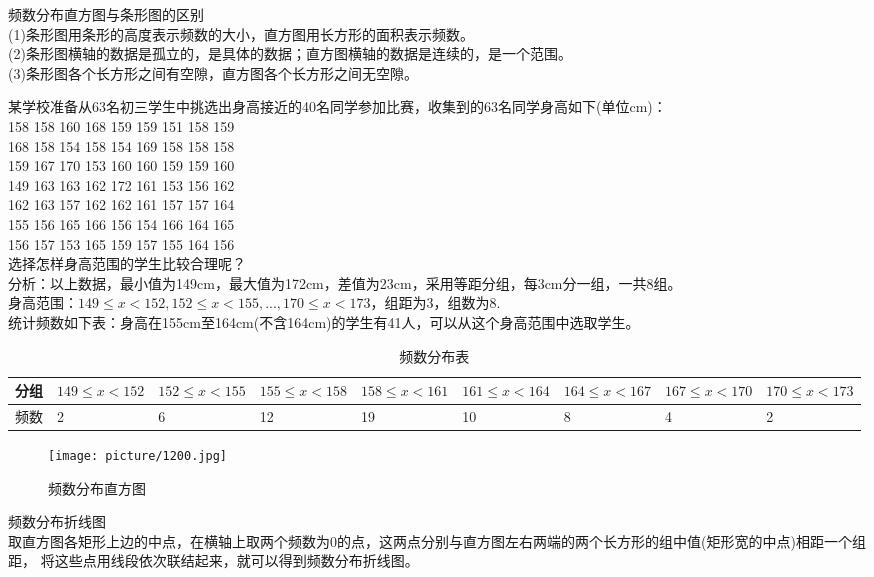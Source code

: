 \documentclass{ecnuthesis}
\begin{document}
\begin{knowledge}
    频数分布直方图与条形图的区别 \\
    (1)条形图用条形的高度表示频数的大小，直方图用长方形的面积表示频数。\\
    (2)条形图横轴的数据是孤立的，是具体的数据；直方图横轴的数据是连续的，是一个范围。 \\
    (3)条形图各个长方形之间有空隙，直方图各个长方形之间无空隙。
\end{knowledge}
\begin{example}
    某学校准备从63名初三学生中挑选出身高接近的40名同学参加比赛，收集到的63名同学身高如下(单位cm)：\\
    158 158 160 168 159 159 151 158 159 \\
    168 158 154 158 154 169 158 158 158 \\
    159 167 170 153 160 160 159 159 160 \\
    149 163 163 162 172 161 153 156 162 \\
    162 163 157 162 162 161 157 157 164 \\
    155 156 165 166 156 154 166 164 165 \\
    156 157 153 165 159 157 155 164 156 \\
    选择怎样身高范围的学生比较合理呢？\\
    分析：以上数据，最小值为149cm，最大值为172cm，差值为23cm，采用等距分组，每3cm分一组，一共8组。\\
    身高范围：$149 \le x < 152, 152 \le x < 155,...,170 \le x < 173$，组距为3，组数为8. \\
    统计频数如下表：身高在155cm至164cm(不含164cm)的学生有41人，可以从这个身高范围中选取学生。
\end{example}
\begin{table}[H]
\centering
\caption{频数分布表}
\begin{tabular}{l|p{1.5cm}|p{1.5cm}|p{1.5cm}|p{1.5cm}|p{1.5cm}|p{1.5cm}|p{1.5cm}|p{1.5cm}}
\hline
分组 & $149\le x<152$ & $152\le x<155$ & $155\le x<158$ & $158\le x<161$ & $161\le x<164$ & $164\le x<167$ & $167\le x<170$ & $170\le x<173$\\
\hline
频数 & 2 & 6 & 12 & 19 & 10 & 8 & 4 & 2 \\
\hline
\end{tabular}
\end{table}
\begin{figure}[H]
\centering
\texttt{[image: picture/1200.jpg]}
\caption{频数分布直方图}
\end{figure}
\begin{knowledge}
    频数分布折线图 \\
    取直方图各矩形上边的中点，在横轴上取两个频数为0的点，这两点分别与直方图左右两端的两个长方形的组中值(矩形宽的中点)相距一个组距，
    将这些点用线段依次联结起来，就可以得到频数分布折线图。
\end{knowledge}
\clearpage
\backmatter
\end{document}

